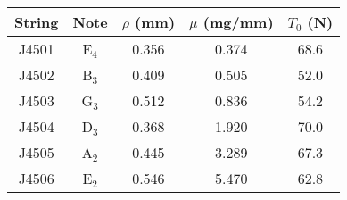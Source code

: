 \begin{tabular}{ccccc}
\toprule
String & Note & $\rho$ (mm) & $\mu$ (mg/mm) & $T_0$ (N) \\
\midrule
J4501 & E$_{4}$ & 0.356 & 0.374 & 68.6 \\
J4502 & B$_{3}$ & 0.409 & 0.505 & 52.0 \\
J4503 & G$_{3}$ & 0.512 & 0.836 & 54.2 \\
J4504 & D$_{3}$ & 0.368 & 1.920 & 70.0 \\
J4505 & A$_{2}$ & 0.445 & 3.289 & 67.3 \\
J4506 & E$_{2}$ & 0.546 & 5.470 & 62.8 \\
\bottomrule
\end{tabular}
